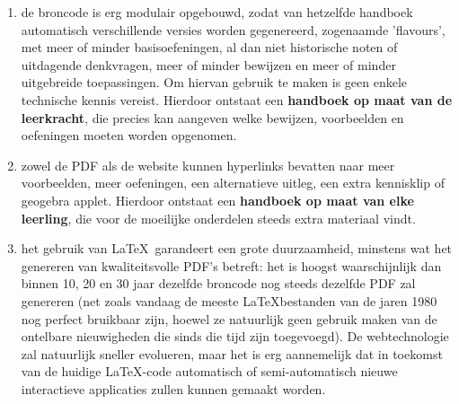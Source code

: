 \documentclass{ximera}
\begin{document}
\begin{enumerate}
        \item de broncode is erg modulair opgebouwd, zodat van hetzelfde handboek automatisch verschillende versies worden gegenereerd, zogenaamde 'flavours', met meer of minder basisoefeningen, al dan niet historische noten of uitdagende denkvragen, meer of minder bewijzen en meer of minder uitgebreide toepassingen. Om hiervan gebruik te maken is geen enkele technische kennis vereist. Hierdoor ontstaat een \textbf{handboek op maat van de leerkracht}, die precies kan aangeven welke bewijzen, voorbeelden en oefeningen moeten worden opgenomen.
        \item zowel de PDF als de website kunnen hyperlinks bevatten naar meer voorbeelden, meer oefeningen, een alternatieve uitleg, een extra kennisklip of geogebra applet. Hierdoor ontstaat een \textbf{handboek op maat van elke leerling}, die voor de moeilijke onderdelen steeds extra materiaal vindt.
        \item het gebruik van \LaTeX\ garandeert een grote duurzaamheid, minstens wat het genereren van kwaliteitsvolle PDF's betreft: het is hoogst waarschijnlijk dan binnen 10, 20 en 30 jaar dezelfde broncode nog steeds dezelfde PDF zal genereren (net zoals vandaag de meeste \LaTeX bestanden van de jaren 1980 nog perfect bruikbaar zijn, hoewel ze natuurlijk geen gebruik maken van de ontelbare nieuwigheden die sinds die tijd zijn toegevoegd). De webtechnologie zal natuurlijk sneller evolueren, maar het is erg aannemelijk dat in toekomst van de huidige \LaTeX-code automatisch of semi-automatisch nieuwe interactieve applicaties zullen kunnen gemaakt worden.
    \end{enumerate}
\end{document}
